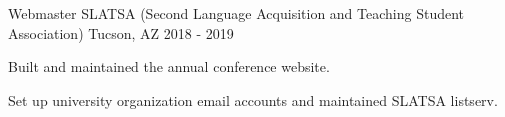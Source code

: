 \begin{cventries}

\cventry
{Webmaster} %
{SLATSA  (Second Language Acquisition and Teaching Student Association)} %
{Tucson, AZ} %
{2018 - 2019} %
{ %
\begin{cvitems}
\item {Built and maintained the annual conference website.}
\item {Set up university organization email accounts and maintained SLATSA listserv.}
\end{cvitems}
}




\end{cventries}